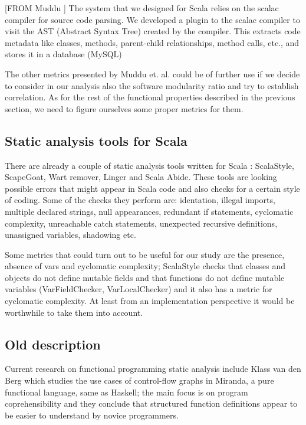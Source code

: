 \documentclass{article}
\begin{document}
[FROM Muddu ] The system that we designed for Scala relies on the scalac compiler for source code parsing. We developed a plugin to the scalac compiler to visit the AST (Abstract Syntax Tree) created by the compiler. This extracts code metadata like classes, methods, parent-child relationships, method calls, etc., and stores it in a database (MySQL)

The other metrics presented by Muddu et. al. could be of further use if we decide to consider in our analysis also the software modularity ratio and try to establish correlation. As for the rest of the functional properties described in the previous section, we need to figure ourselves some proper metrics for them.






\subsection {Static analysis tools for Scala}
There are already a couple of static analysis tools written for Scala : ScalaStyle, ScapeGoat, Wart remover, Linger and Scala Abide. These tools are looking possible errors that might appear in Scala code and also checks for a certain style of coding. Some of the checks they perform are: identation, illegal imports, multiple declared strings, null appearances, redundant if statements, cyclomatic complexity, unreachable catch statements, unexpected recursive definitions, unassigned variables, shadowing etc. \par

Some metrics that could turn out to be useful for our study are  the presence, absence of vars and cyclomatic complexity; ScalaStyle checks that classes and objects do not define mutable fields and that functions do not define mutable variables (VarFieldChecker, VarLocalChecker) \cite{scalastyle} and it also has a metric for cyclomatic complexity. At least from an implementation perspective it would be worthwhile to take them into account.\par

\subsection{Old description}

Current research on functional programming static analysis include Klass van den Berg \cite{DBLP:journals/infsof/BergB95} which studies the use cases of control-flow graphs in Miranda, a pure functional language, same as Haskell; the main focus is on program coprehensibility and they conclude that structured function definitions appear to be easier to understand by novice programmers. \par
\end{document}
